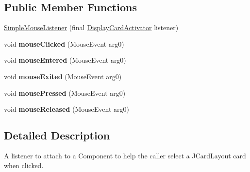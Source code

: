 \subsection*{Public Member Functions}
\begin{DoxyCompactItemize}
\item 
\hyperlink{classgov_1_1fnal_1_1ppd_1_1dd_1_1util_1_1SimpleMouseListener_a56edbdbbfeeea46b9f6744e6904c65c6}{Simple\-Mouse\-Listener} (final \hyperlink{interfacegov_1_1fnal_1_1ppd_1_1dd_1_1util_1_1DisplayCardActivator}{Display\-Card\-Activator} listener)
\item 
\hypertarget{classgov_1_1fnal_1_1ppd_1_1dd_1_1util_1_1SimpleMouseListener_afacf2e7d67af79f20043835ac3df6126}{void {\bfseries mouse\-Clicked} (Mouse\-Event arg0)}\label{classgov_1_1fnal_1_1ppd_1_1dd_1_1util_1_1SimpleMouseListener_afacf2e7d67af79f20043835ac3df6126}

\item 
\hypertarget{classgov_1_1fnal_1_1ppd_1_1dd_1_1util_1_1SimpleMouseListener_a72114b6e103fff75a6ea3d9d7967781d}{void {\bfseries mouse\-Entered} (Mouse\-Event arg0)}\label{classgov_1_1fnal_1_1ppd_1_1dd_1_1util_1_1SimpleMouseListener_a72114b6e103fff75a6ea3d9d7967781d}

\item 
\hypertarget{classgov_1_1fnal_1_1ppd_1_1dd_1_1util_1_1SimpleMouseListener_ac69d1a1b6f1e2e85d4ebbe09eb064d2f}{void {\bfseries mouse\-Exited} (Mouse\-Event arg0)}\label{classgov_1_1fnal_1_1ppd_1_1dd_1_1util_1_1SimpleMouseListener_ac69d1a1b6f1e2e85d4ebbe09eb064d2f}

\item 
\hypertarget{classgov_1_1fnal_1_1ppd_1_1dd_1_1util_1_1SimpleMouseListener_af08f386c74fdd5b2432e1a35e285c205}{void {\bfseries mouse\-Pressed} (Mouse\-Event arg0)}\label{classgov_1_1fnal_1_1ppd_1_1dd_1_1util_1_1SimpleMouseListener_af08f386c74fdd5b2432e1a35e285c205}

\item 
\hypertarget{classgov_1_1fnal_1_1ppd_1_1dd_1_1util_1_1SimpleMouseListener_ab6b202febb74072723c93fa830d0e51e}{void {\bfseries mouse\-Released} (Mouse\-Event arg0)}\label{classgov_1_1fnal_1_1ppd_1_1dd_1_1util_1_1SimpleMouseListener_ab6b202febb74072723c93fa830d0e51e}

\end{DoxyCompactItemize}


\subsection{Detailed Description}
A listener to attach to a Component to help the caller select a J\-Card\-Layout card when clicked.

